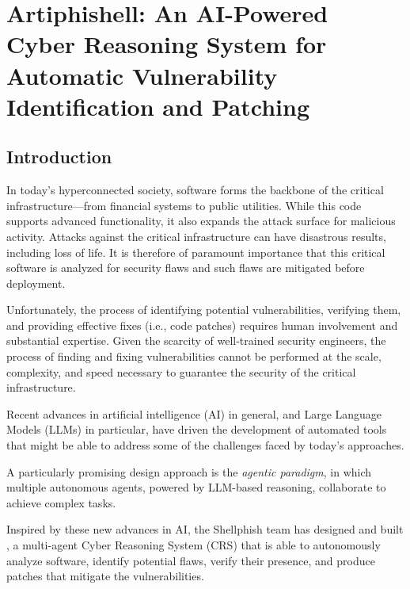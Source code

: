 
\chapter{Artiphishell: An AI-Powered Cyber Reasoning System for Automatic Vulnerability Identification and Patching}
\label{ch:artiphishell}

\section{Introduction}
\label{introduction}

In today's hyperconnected society, software forms the backbone of the critical infrastructure---from financial systems to public utilities.
While this code supports advanced functionality, it also expands the attack surface for malicious activity.
Attacks against the critical infrastructure can have disastrous results, including loss of life.
It is therefore of paramount importance that this critical software is analyzed for security flaws and such flaws are mitigated before deployment.

Unfortunately, the process of identifying potential vulnerabilities, verifying them, and providing effective fixes (i.e., code patches) requires human involvement and substantial expertise.
Given the scarcity of well-trained security engineers, the process of finding and fixing vulnerabilities cannot be performed at the scale, complexity, and speed necessary to guarantee the security of the critical infrastructure.

Recent advances in artificial intelligence (AI) in general, and Large Language Models (LLMs) in particular, have driven the development of automated tools that might be able to address some of the challenges faced by today's approaches.

A particularly promising design approach is the \emph{agentic paradigm}, in which multiple autonomous agents, powered by LLM-based reasoning, collaborate to achieve complex tasks.

Inspired by these new advances in AI, the Shellphish team has designed and built \artiphishell, a multi-agent Cyber Reasoning System (CRS) that is able to autonomously analyze software, identify potential flaws, verify their presence, and produce patches that mitigate the vulnerabilities.

